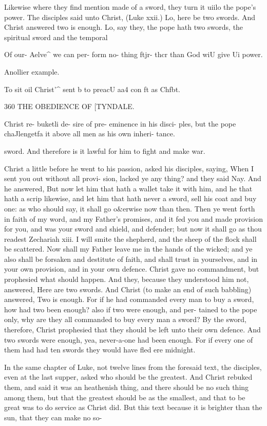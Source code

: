 \documentclass{custom}
\begin{document}
{Likewise where they find mention made of a sword, they 
turn it uiilo the pope's power. The disciples said unto 
Christ, (Luke xxii.) Lo, here be two swords. And Christ 
answered two is enough. Lo, say they, the pope 
hath two swords, the spiritual sword and the temporal 

Of our- 
Aelve^ we 
can per- 
form no- 
thing ftjr- 
thcr than 
God wiU 
give Ui 
power. 

Anollier 
example. 

To sit oil 
Christ'^ 
sent b to 
preacU aa4 
con ft as 
Chfbt. 


360
THE OBEDIENCE OF
[TYNDALE.

Christ re- 
buketli de- 
sire of pre- 
eminence 
in his disci- 
ples, but 
the pope 
chaJlengetfa 
it above all 
men as his 
own inheri- 
tance. 

sword. And therefore is it lawful for him to fight and 
make war. 

Christ a little before he went to his passion, asked his 
disciples, saying, When I sent you out without all provi- 
sion, lacked ye any thing? and they said Nay. And he 
answered, But now let him that hath a wallet take it with 
him, and he that hath a scrip likewise, and let him that 
hath never a sword, sell his coat and buy one: as who 
should say, it shall go o&erwise now than then. Then ye 
went forth in faith of my word, and my Father's promises, 
and it fed you and made provision for you, and was your 
sword and shield, and defender; but now it shall go as 
thou readest Zechariah xiii. I will smite the shepherd, and 
the sheep of the flock shall be scattered. Now shall my 
Father leave me in the hands of the wicked; and ye also 
shall be forsaken and destitute of faith, and shall trust in 
yourselves, and in your own provision, and in your own 
defence. Christ gave no commandment, but prophesied 
what should happen. And they, because they understood 
him not, answered, Here are two swords. And Christ (to 
make an end of such babbling) answered, Two is enough. 
For if he had commanded every man to buy a sword, how 
had two been enough? also if two were enough, and per- 
tained to the pope only, why are they all commanded to 
buy every man a sword? By the sword, therefore, Christ 
prophesied that they should be left unto their own defence. 
And two swords were enough, yea, never-a-one had been 
enough. For if every one of them had had ten swords they 
would have fled ere midnight. 

In the same chapter of Luke, not twelve lines from the 
foresaid text, the disciples, even at the last supper, 
asked who should be the greatest. And Christ rebuked 
them, and said it was an heathenish thing, and there 
should be no such thing among them, but that the 
greatest should be as the smallest, and that to be great 
was to do service as Christ did. But this text because 
it is brighter than the sun, that they can make no so- 


}
\end{document}
